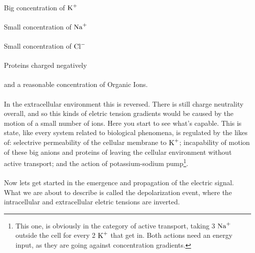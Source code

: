 \documentclass[12pt,  letterpaper]{article}
\begin{document}
\paragraph*{}
Big concentration of $\ce{K+}$
\paragraph*{}
Small concentration of $\ce{Na+}$
\paragraph*{}
Small concentration of $\ce{Cl-}$
\paragraph*{}
Proteins charged negatively
\paragraph*{}
and a reasonable concentration of Organic Ions.
\paragraph*{}
In the extracellular environment this is reversed. There is still charge neutrality overall, and so this kinds of eletric tension gradients would be caused by the motion of a small number of ions. Here you start to see what's capable. This is state, like every system related to biological phenomena, is regulated by the likes of: selectrive permeability of the cellular membrane to $\ce{K+}$; incapability of motion of these big anions and proteins of leaving the cellular environment without active transport; and the action of potassium-sodium pump\footnote{This one, is obviously in the category of active transport, taking 3 $\ce{Na+}$ outside the cell for every 2 $\ce{K+}$ that get in. Both actions need an energy input, as they are going against concentration gradients.}.
\paragraph*{}
Now lets get started in the emergence and propagation of the electric signal. What we are about to describe is called the depolarization event, where the intracellular and extracellular eletric tensions are inverted.
\end{document}
